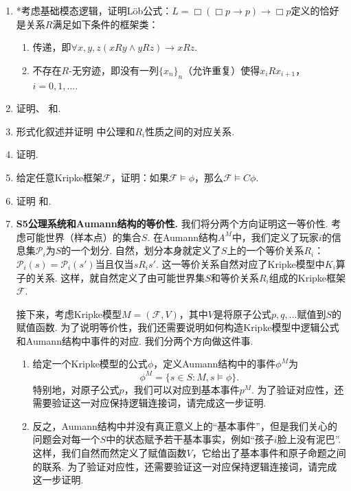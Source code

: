 \begin{enumerate}[wide, labelindent=0pt]

    \item *考虑基础模态逻辑，证明Löb公式：$L=\Box(\Box p\to p)\to\Box p$定义的恰好是关系$R$满足如下条件的框架类：
    \begin{enumerate}
        \item 传递，即$\forall x,y,z(xRy\wedge yRz)\to xRz$.
        \item 不存在$R$-无穷迹，即没有一列$\{x_n\}_n$（允许重复）使得$x_iRx_{i+1}$，$i=0,1,\dots$.
    \end{enumerate}

    \item \label{exercise:epistemic-logic-axioms} 证明、 和.
    
    \item \label{exercise:epistemic-logic-axiom-structure} 形式化叙述并证明 中公理和$R_i$性质之间的对应关系. 
    
    \item \label{exercise:relation-properties} 证明.
    
    \item  给定任意Kripke框架$\mathcal F$，证明：如果$\mathcal F\vDash\phi$，那么$\mathcal F\vDash C\phi$.

    \item \label{exercise:common-knowledge-axioms} 证明 和.

    \item \label{S5-Aumann-equivalence} \textbf{S5公理系统和Aumann结构的等价性. } 我们将分两个方向证明这一等价性. 考虑可能世界（样本点）的集合$S$. 在Aumann结构$A^M$中，我们定义了玩家$i$的信息集$\mathcal P_i$为$S$的一个划分. 自然，划分本身就定义了$S$上的一个等价关系$R_i$：$\mathcal P_i(s)=\mathcal P_i(s')$当且仅当$sR_is'$. 这一等价关系自然对应了Kripke模型中$K_i$算子的关系. 这样，就自然定义了由可能世界集$S$和等价关系$R_i$组成的Kripke框架$\mathcal F$. 
    
    接下来，考虑Kripke模型$M=(\mathcal F, V)$，其中$V$是将原子公式$p,q,\dots$赋值到$S$的赋值函数. 为了说明等价性，我们还需要说明如何构造Kripke模型中逻辑公式和Aumann结构中事件的对应. 我们分两个方向做这件事. 
    \begin{enumerate}
        \item 给定一个Kripke模型的公式$\phi$，定义Aumann结构中的事件$\phi^M$为
        \[\phi^M=\{s\in S:M,s\vDash \phi\}.\]
        特别地，对原子公式$p$，我们可以对应到基本事件$p^M$. 为了验证对应性，还需要验证这一对应保持逻辑连接词，请完成这一步证明. 
        \item 反之，Aumann结构中并没有真正意义上的“基本事件”，但是我们关心的问题会对每一个$S$中的状态赋予若干基本事实，例如“孩子$i$脸上没有泥巴”. 这样，我们自然而然定义了赋值函数$V$，它给出了基本事件和原子命题之间的联系. 为了验证对应性，还需要验证这一对应保持逻辑连接词，请完成这一步证明. 
    \end{enumerate}


\end{enumerate}

